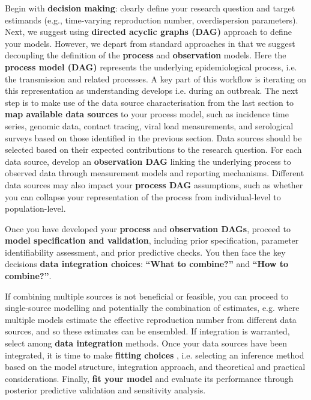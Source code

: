 \documentclass{article}
\begin{document}
Begin with \textbf{decision making}: clearly define your research question and target estimands (e.g., time-varying reproduction number, overdispersion parameters).
Next, we suggest using \textbf{directed acyclic graphs (DAG)} approach to define your models. However, we depart from standard approaches in that we suggest decoupling the definition of the \textbf{process} and \textbf{observation} models.
Here the \textbf{process model (DAG)} represents the underlying epidemiological process, i.e. the transmission and related processes.
A key part of this workflow is iterating on this representation as understanding develops i.e. during an outbreak.
The next step is to make use of the data source characterisation from the last section to \textbf{map available \textbf{data sources} }to your process model, such as incidence time series, genomic data, contact tracing, viral load measurements, and serological surveys based on those identified in the previous section.
Data sources should be selected based on their expected contributions to the research question.
For each data source, develop an \textbf{observation DAG} linking the underlying process to observed data through measurement models and reporting mechanisms.
Different data sources may also impact your \textbf{process DAG} assumptions, such as whether you can collapse your representation of the process from individual-level to population-level.

Once you have developed your \textbf{process} and \textbf{observation DAGs}, proceed to \textbf{model specification and validation}, including prior specification, parameter identifiability assessment, and prior predictive checks.
You then face the key decisions \textbf{data integration choices}: \textbf{``What to combine?''} and \textbf{``How to combine?''}.

If combining multiple sources is not beneficial or feasible, you can proceed to single-source modelling and potentially the combination of estimates, e.g. where multiple models estimate the effective reproduction number from different data sources, and so these estimates can be ensembled.
If integration is warranted, select among \textbf{data integration} methods. 
Once your data sources have been integrated, it is time to make \textbf{fitting choices} , i.e. selecting an inference method based on the model structure, integration approach, and theoretical and practical considerations. 
Finally, \textbf{fit your model} and evaluate its performance through posterior predictive validation and sensitivity analysis.
\end{document}
